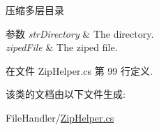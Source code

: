 压缩多层目录 


\begin{DoxyParams}{参数}
{\em str\-Directory} & The directory.\\
\hline
{\em ziped\-File} & The ziped file.\\
\hline
\end{DoxyParams}


在文件 Zip\-Helper.\-cs 第 99 行定义.



该类的文档由以下文件生成\-:\begin{DoxyCompactItemize}
\item 
File\-Handler/\hyperlink{_zip_helper_8cs}{Zip\-Helper.\-cs}\end{DoxyCompactItemize}
